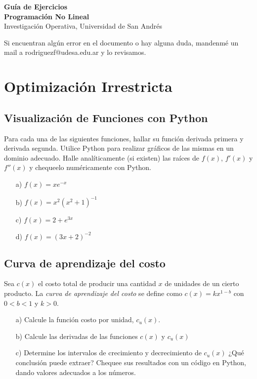 \documentclass[12pt]{article}
\begin{document}
\begin{center}
    {\LARGE \textbf{Guía de Ejercicios \\Programación No Lineal}}\\[0.5em]
    {Investigación Operativa, Universidad de San Andrés}
\end{center}

Si encuentran algún error en el documento o hay alguna duda, mandenmé un mail a rodriguezf@udesa.edu.ar y lo revisamos.

\section{Optimización Irrestricta}

\subsection{Visualización de Funciones con Python}

Para cada una de las siguientes funciones, hallar su función derivada primera y derivada segunda. Utilice Python para realizar gráficos de las mismas en un dominio adecuado. Halle analíticamente (si existen) las raíces de $f(x)$, $f'(x)$ y $f''(x)$ y chequeelo numéricamente con Python.
\begin{itemize}
    \item[a)] $f(x) = xe^{-x}$
    \item[b)] $f(x) = x^2 (x^2+1)^{-1}$
    \item[c)] $f(x) = 2 + e^{3x}$
    \item[d)] $f(x) = (3x+2)^{-2}$
\end{itemize}

\subsection{Curva de aprendizaje del costo}

Sea $c(x)$ el costo total de producir una cantidad $x$ de unidades de un cierto producto. La \textit{curva de aprendizaje del costo} se define como $c(x) = kx^{1-b}$ con $0 < b < 1$ y $k>0$.
\begin{itemize}
    \item[a)] Calcule la función costo por unidad, $c_u (x)$. 
    \item[b)] Calcule las derivadas de las funciones $c(x)$ y $c_u (x)$
    \item[c)] Determine los intervalos de crecimiento y decrecimiento de $c_u (x)$ ¿Qué conclusión puede extraer? Chequee sus resultados con un código en Python, dando valores adecuados a los números.
\end{itemize}
\end{document}
